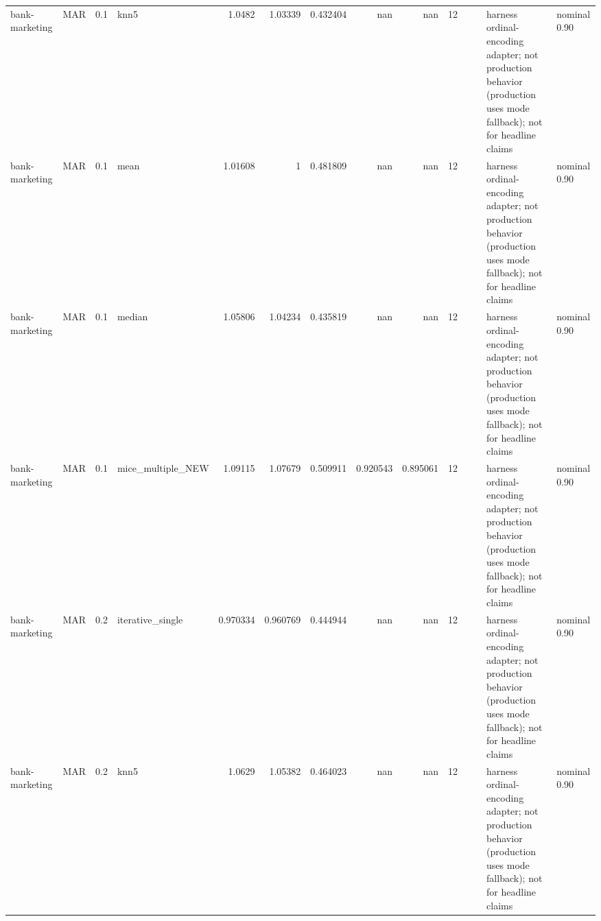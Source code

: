 \begin{table}[ht]
\begin{tabular}{llrlrrrrrrllll}
 bank-marketing       & MAR         &         0.1 & knn5              &       1.0482   &             1.03339  &                 0.432404 &                     nan        &                       nan        &        12 &                    &                                         & harness ordinal-encoding adapter; not production behavior (production uses mode fallback); not for headline claims & nominal 0.90              \\
 bank-marketing       & MAR         &         0.1 & mean              &       1.01608  &             1        &                 0.481809 &                     nan        &                       nan        &        12 &                    &                                         & harness ordinal-encoding adapter; not production behavior (production uses mode fallback); not for headline claims & nominal 0.90              \\
 bank-marketing       & MAR         &         0.1 & median            &       1.05806  &             1.04234  &                 0.435819 &                     nan        &                       nan        &        12 &                    &                                         & harness ordinal-encoding adapter; not production behavior (production uses mode fallback); not for headline claims & nominal 0.90              \\
 bank-marketing       & MAR         &         0.1 & mice\_multiple\_NEW &       1.09115  &             1.07679  &                 0.509911 &                       0.920543 &                         0.895061 &        12 &                    &                                         & harness ordinal-encoding adapter; not production behavior (production uses mode fallback); not for headline claims & nominal 0.90              \\
 bank-marketing       & MAR         &         0.2 & iterative\_single  &       0.970334 &             0.960769 &                 0.444944 &                     nan        &                       nan        &        12 &                    &                                         & harness ordinal-encoding adapter; not production behavior (production uses mode fallback); not for headline claims & nominal 0.90              \\
 bank-marketing       & MAR         &         0.2 & knn5              &       1.0629   &             1.05382  &                 0.464023 &                     nan        &                       nan        &        12 &                    &                                         & harness ordinal-encoding adapter; not production behavior (production uses mode fallback); not for headline claims & nominal 0.90              \\

\end{tabular}
\end{table}
